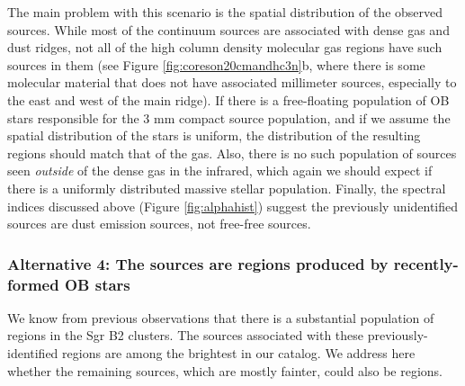 \documentclass[twocolumn]{aastex61}
\begin{document}
The main problem with this scenario is the spatial distribution of the observed
sources.  While most of the continuum sources are associated with dense gas and
dust ridges, not all of the high column density molecular gas regions have such
sources in them (see Figure \ref{fig:coreson20cmandhc3n}b, where there is some
molecular material that does not have associated millimeter sources,
especially to the east and west of the main ridge).  If there is a
free-floating population of OB stars responsible for the 3 mm compact source
population, and if we assume the spatial distribution of the stars is uniform,
the distribution of the resulting \hii regions should match that of the gas.
Also, there is no such population of sources seen \emph{outside} of the dense
gas in the infrared,
which again we should expect if there is a uniformly distributed massive stellar
population.  Finally, the spectral indices discussed above (Figure
\ref{fig:alphahist}) suggest the previously unidentified sources are dust
emission sources, not free-free sources.



\subsubsection{Alternative 4: The sources are \hii regions produced by
recently-formed OB stars}
\label{sec:theyarehiiregions}

We know from previous observations
\citep[e.g.,][]{Mehringer1995b,De-Pree1996a,De-Pree2015a} that there is a
substantial population of \hii regions in the Sgr B2 clusters.  The \nhii
sources associated with these previously-identified \hii regions are among the
brightest in our catalog.  We address here whether the remaining  sources,
which are mostly fainter, could also be \hii regions.
\end{document}
